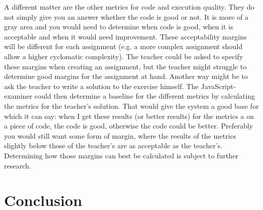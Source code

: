 \documentclass{article}
\begin{document}
A different matter are the other metrics for code and execution quality. They
do not simply give you an answer whether the code is good or not. It is more of
a gray area and you would need to determine when code is good, when it is
acceptable and when it would need improvement. These acceptability margins will
be different for each assignment (e.g. a more complex assignment should allow a
higher cyclomatic complexity). The teacher could be asked to specify these
margins when creating an assignment, but the teacher might struggle to
determine good margins for the assignment at hand. Another way might be to ask
the teacher to write a solution to the exercise himself. The
JavaScript-examiner could then determine a baseline for the different metrics
by calculating the metrics for the teacher's solution. That would give the
system a good base for which it can say: when I get these results (or better
results) for the metrics a on a piece of code, the code is good, otherwise the
code could be better. Preferably you would still want some form of margin,
where the results of the metrics slightly below those of the teacher's are as
acceptable as the teacher's. Determining how those margins can best be
calculated is subject to further research.

\section{Conclusion}



\end{document}
